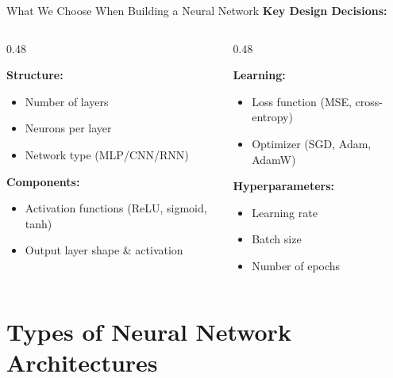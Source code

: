 \begin{frame}{What We Choose When Building a Neural Network}
\textbf{Key Design Decisions:}
\vspace{0.5em}

\begin{columns}[t]
\begin{column}{0.48\textwidth}
\begin{tcolorbox}[colback=blue!5, colframe=blue!50, title=\textbf{1. Model Architecture}]
\textbf{Structure:}
\begin{itemize}
\item Number of layers
\item Neurons per layer
\item Network type (MLP/CNN/RNN)
\end{itemize}
\vspace{0.3em}
\textbf{Components:}
\begin{itemize}
\item Activation functions (ReLU, sigmoid, tanh)
\item Output layer shape \& activation
\end{itemize}
\end{tcolorbox}
\end{column}

\begin{column}{0.48\textwidth}
\begin{tcolorbox}[colback=green!5, colframe=green!50!black, title=\textbf{2. Training Strategy}]
\textbf{Learning:}
\begin{itemize}
\item Loss function (MSE, cross-entropy)
\item Optimizer (SGD, Adam, AdamW)
\end{itemize}
\vspace{0.3em}
\textbf{Hyperparameters:}
\begin{itemize}
\item Learning rate
\item Batch size
\item Number of epochs
\end{itemize}
\end{tcolorbox}
\end{column}
\end{columns}
\end{frame}


\section{Types of Neural Network Architectures}

